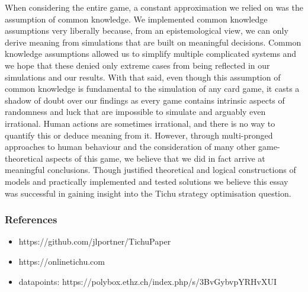When considering the entire game, a constant approximation we relied on was the assumption of common knowledge. We implemented common knowledge assumptions very liberally because, from an epistemological view, we can only derive meaning from simulations that are built on meaningful decisions. Common knowledge assumptions allowed us to simplify multiple complicated systems and we hope that these denied only extreme cases from being reflected in our simulations and our results. With that said, even though this assumption of common knowledge is fundamental to the simulation of any card game, it casts a shadow of doubt over our findings as every game contains intrinsic aspects of randomness and luck that are impossible to simulate and arguably even irrational. Human actions are sometimes irrational, and there is no way to quantify this or deduce meaning from it. However, through multi-pronged approaches to human behaviour and the consideration of many other game-theoretical aspects of this game, we believe that we did in fact arrive at meaningful conclusions. Though justified theoretical and logical constructions of models and practically implemented and tested solutions we believe this essay was successful in gaining insight into the Tichu strategy optimisation question.
\subsubsection{References}
\begin{itemize}
\item https://github.com/jlportner/TichuPaper \label{github}
\item https://onlinetichu.com
\item datapoints: https://polybox.ethz.ch/index.php/s/3BvGybvpYRHvXUI
\end{itemize}


